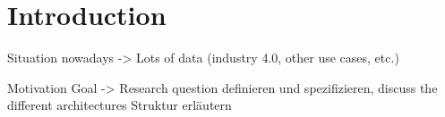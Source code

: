 \chapter{Introduction}
\label{cha:Introduction} %
Situation nowadays -> Lots of data (industry 4.0, other use cases, etc.)

Motivation
Goal -> Research question definieren und spezifizieren, discuss the different architectures
Struktur erläutern


